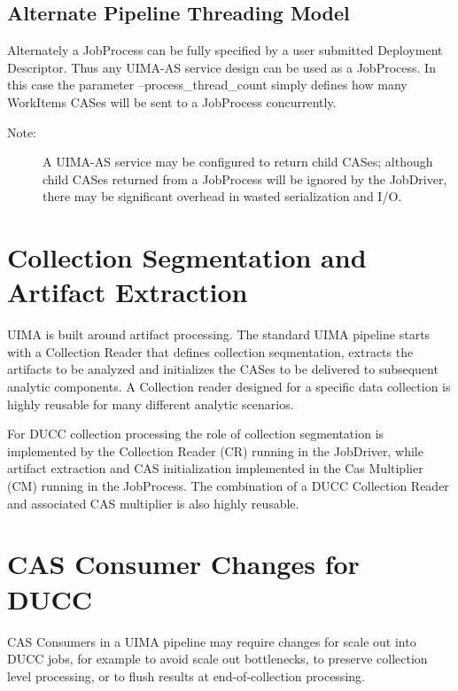    \subsection{Alternate Pipeline Threading Model}
   
   Alternately a JobProcess can be fully specified by a user submitted
   Deployment Descriptor. Thus any UIMA-AS service design can be used as a
   JobProcess. In this case the parameter --process_thread_count simply defines
   how many WorkItems CASes will be sent to a JobProcess concurrently.
   
	\begin{description}
	    \item[Note:] A UIMA-AS service may be configured to
	    return child CASes; although child CASes returned from a JobProcess will be
	    ignored by the JobDriver, there may be significant overhead in wasted
	    serialization and I/O.
	\end{description}

\section{Collection Segmentation and Artifact Extraction}

UIMA is built around artifact processing. The standard UIMA pipeline starts with
a Collection Reader that defines collection seqmentation, extracts the artifacts
to be analyzed and initializes the CASes to be delivered to subsequent analytic components. 
A Collection reader designed for a specific data collection is highly reusable
for many different analytic scenarios.

For DUCC collection processing the role of collection segmentation is
implemented by the Collection Reader (CR) running in the JobDriver, while
artifact extraction and CAS initialization implemented in the Cas Multiplier
(CM) running in the JobProcess. The combination of a DUCC Collection Reader and
associated CAS multiplier is also highly reusable. 

\section{CAS Consumer Changes for DUCC}

CAS Consumers in a UIMA pipeline may require changes for scale out into DUCC
jobs, for example to avoid scale out bottlenecks, to preserve collection level
processing, or to flush results at end-of-collection processing.
   
